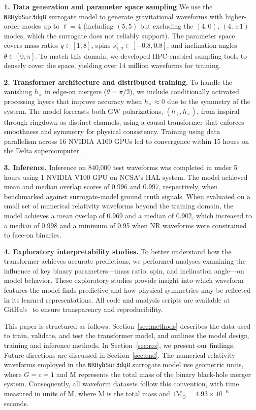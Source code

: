 \documentclass[12pt]{iopart}
\begin{document}
\textbf{1. Data generation and parameter space sampling} We use the \texttt{NRHybSur3dq8} surrogate model to generate gravitational waveforms with higher-order modes up to $\ell = 4$ (including $(5,5)$ but excluding the $(4,0)$, $(4,\pm1)$ modes, which the surrogate does not reliably support). The parameter space covers mass ratios $q \in [1, 8]$, spins $s^z_{{1,2}} \in [-0.8, 0.8]$, and inclination angles $\theta \in [0, \pi]$. To match this domain, we developed HPC-enabled sampling tools to densely cover the space, yielding over 14 million waveforms for training.

\textbf{2. Transformer architecture and distributed training.} To handle the vanishing $h_\times$ in edge-on mergers ($\theta = \pi/2$), we include conditionally activated processing layers that improve accuracy when $h_\times \approx 0$ due to the symmetry of the system. The model forecasts both GW polarizations, $(h_+, h_\times)$, from inspiral through ringdown as distinct channels, using a causal transformer that enforces smoothness and symmetry for physical consistency. Training using data parallelism across 16 NVIDIA A100 GPUs led to convergence within 15 hours on the Delta supercomputer.

\textbf{3. Inference.} Inference on 840,000 test waveforms was completed in under 5 hours using 1 NVIDIA V100 GPU on NCSA's HAL system. The model achieved mean and median overlap scores of 0.996 and 0.997, respectively, when benchmarked against surrogate-model ground truth signals. When evaluated on a small set of numerical relativity waveforms beyond the training domain, the model achieves a mean overlap of 0.969 and a median of 0.902, which increased to a median of 0.998 and a minimum of 0.95 when NR waveforms were constrained to face-on binaries.

\textbf{4. Exploratory interpretability studies.}  To better understand how the transformer achieves accurate predictions, we performed analyses examining the influence of key binary parameters—mass ratio, spin, and inclination angle—on model behavior. These exploratory studies provide insight into which waveform features the model finds predictive and how physical symmetries may be reflected in its learned representations. All code and analysis scripts are available at GitHub~\cite{githubhom} to ensure transparency and reproducibility.

This paper is structured as follows: Section~\ref{sec:methods} describes the data used to train, validate, and test the transformer model, and outlines the model design, training and inference methods. In Section~\ref{sec:res}, we present our findings. Future directions are discussed in Section~\ref{sec:end}. The numerical relativity waveforms employed in the \texttt{NRHybSur3dq8} surrogate model use geometric units, where $G = c = 1$ and $\textrm{M}$ represents the total mass of the binary black-hole merger system. Consequently, all waveform datasets follow this convention, with time measured in units of $\textrm{M}$, where $\textrm{M}$ is the total mass and $1\textrm{M}_\odot = 4.93 \times 10^{-6}$ seconds.
\end{document}

